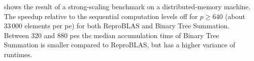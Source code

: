  shows the result of a strong-scaling benchmark on a distributed-memory machine.
The speedup relative to the sequential computation levels off for $p \geq 640$ (about $33\,000$ elements per \gls{pe}) for both ReproBLAS and Binary Tree Summation.
Between $320$ and $880$ \glspl{pe} the median accumulation time of Binary Tree Summation is smaller compared to ReproBLAS, but has a higher variance of runtimes.